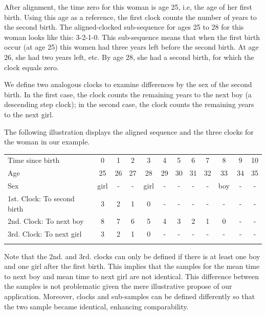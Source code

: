 \documentclass{article}
\begin{document}
After alignment, the time zero for this woman is age 25, i.e, the age of her first birth. Using this age as a reference, the first clock counts the number of years to the second birth. The aligned-clocked sub-sequence for ages 25 to 28 for this woman looks like this: 3-2-1-0. This sub-sequence means that when the first birth occur (at age 25) this women had three years left before the second birth. At age 26, she had two years left, etc. By age 28, she had a second birth, for which the clock equals zero.

We define two analogous clocks to examine differences by the sex of the second birth. In the first case, the clock counts the remaining years to the next boy (a descending step clock); in the second case, the clock counts the remaining years to the next girl. 

The following illustration displays the aligned sequence and the three clocks for the woman in our example.\\

\begin{center}
\begin{tabular}{lccccccccccc}
\hline
    Time since birth & 0 & 1 & 2 & 3 & 4 & 5 & 6 & 7 & 8 & 9 & 10 \\
    Age & 25 & 26 & 27 & 28 & 29 & 30 & 31 & 32 & 33 & 34 & 35 \\
    Sex & girl & - & - & girl & - & - & - & - & boy & - & - \\
    1st. Clock: To second birth & 3 & 2 & 1 & 0 & - & - & - & - & - & - & - \\
    2nd. Clock: To next boy & 8 & 7 & 6 & 5 & 4 & 3 & 2 & 1 & 0 & - & - \\
    3rd. Clock: To next girl & 3 & 2 & 1 & 0 & - & - & - & - & - & - & - \\\hline\\
\end{tabular}
\end{center}

Note that the 2nd. and 3rd. clocks can only be defined if there is at least one boy and one girl after the first birth. This implies that the samples for the mean time to next boy and mean time to next girl are not identical. This difference between the samples is not problematic given the mere illustrative propose of our application. Moreover, clocks and sub-samples can be defined differently so that the two sample became identical, enhancing comparability.
\end{document}
